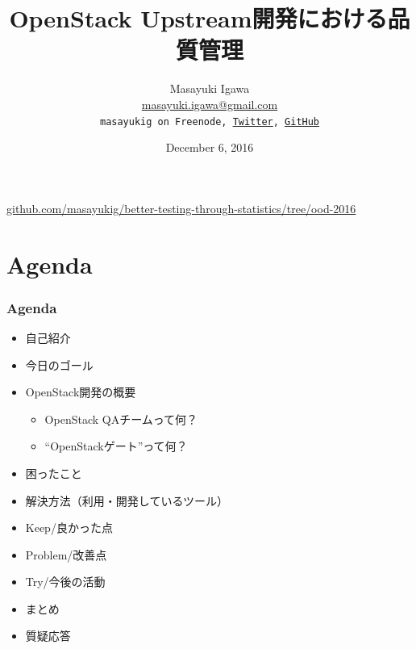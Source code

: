 \documentclass[aspectratio=169,11pt,hyperref={colorlinks=true}]{beamer}
\author[Masayuki Igawa]{%
  \texorpdfstring{%
    \centering
    Masayuki Igawa\\
    \href{mailto:masayuki.igawa@gmail.com}{masayuki.igawa@gmail.com}\\
    \texttt{masayukig on Freenode,
     \href{https://twitter.com/masayukig}{Twitter},
     \href{https://github.com/masayukig}{GitHub}}
  }
  {Masayuki Igawa}
}
\date{December 6, 2016}
\title[OpenStack Upstream開発における品質管理
\hspace{2em}\insertframenumber/\inserttotalframenumber]{OpenStack Upstream開発における品質管理}
\begin{document}


{%
\begin{frame}[noframenumbering]
  \hypersetup{colorlinks,urlcolor=white}
  \titlepage{}
  \centering
  \href{https://github.com/masayukig/better-testing-through-statistics/tree/ood-2016}{github.com/masayukig/better-testing-through-statistics/tree/ood-2016}
\end{frame}
}

\section{Agenda}
\begin{frame}
  \frametitle{Agenda}
  \begin{itemize}
    \item 自己紹介
    \item 今日のゴール
    \item OpenStack開発の概要
    \begin{itemize}
      \item OpenStack QAチームって何？
      \item ``OpenStackゲート''って何？
    \end{itemize}
    \item 困ったこと
    \item 解決方法（利用・開発しているツール）
    \item Keep/良かった点
    \item Problem/改善点
    \item Try/今後の活動
    \item まとめ
    \item 質疑応答
  \end{itemize}
\end{frame}
\end{document}
